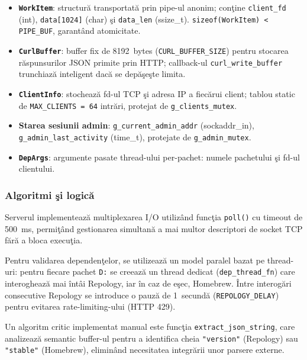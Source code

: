\documentclass[12pt, a4paper]{article}
\begin{document}
\begin{itemize}
    \item \textbf{\texttt{WorkItem}}: structur\u{a} transportat\u{a} prin pipe-ul anonim; con\c{t}ine
    \texttt{client\_fd} (int), \texttt{data[1024]} (char) \c{s}i \texttt{data\_len} (ssize\_t).
    \texttt{sizeof(WorkItem) < PIPE\_BUF}, garantând atomicitate.
    \item \textbf{\texttt{CurlBuffer}}: buffer fix de 8192~bytes (\texttt{CURL\_BUFFER\_SIZE}) pentru
    stocarea r\u{a}spunsurilor JSON primite prin HTTP; callback-ul \texttt{curl\_write\_buffer}
    trunchiaz\u{a} inteligent dac\u{a} se dep\u{a}\c{s}e\c{s}te limita.
    \item \textbf{\texttt{ClientInfo}}: stocheaz\u{a} fd-ul TCP \c{s}i adresa IP a fiec\u{a}rui
    client; tablou static de \texttt{MAX\_CLIENTS = 64} intr\u{a}ri, protejat de
    \texttt{g\_clients\_mutex}.
    \item \textbf{Starea sesiunii admin}: \texttt{g\_current\_admin\_addr} (sockaddr\_in),
    \texttt{g\_admin\_last\_activity} (time\_t), protejate de \texttt{g\_admin\_mutex}.
    \item \textbf{\texttt{DepArgs}}: argumente pasate thread-ului per-pachet: numele pachetului
    \c{s}i fd-ul clientului.
\end{itemize}

\subsubsection{Algoritmi \c{s}i logic\u{a}}

Serverul implementeaz\u{a} multiplexarea I/O utilizând func\c{t}ia \texttt{poll()} cu timeout de
500~ms, permi\c{t}ând gestionarea simultan\u{a} a mai multor descriptori de socket TCP f\u{a}r\u{a}
a bloca execu\c{t}ia.

Pentru validarea dependen\c{t}elor, se utilizeaz\u{a} un model paralel bazat pe thread-uri: pentru
fiecare pachet \texttt{D:} se creeaz\u{a} un thread dedicat (\texttt{dep\_thread\_fn}) care
interogheaz\u{a} mai \^{i}nt\^{a}i Repology, iar \^{i}n caz de e\c{s}ec, Homebrew. \^{I}ntre
interog\u{a}ri consecutive Repology se introduce o pauz\u{a} de 1~secund\u{a}
(\texttt{REPOLOGY\_DELAY}) pentru evitarea rate-limiting-ului (HTTP 429).

Un algoritm critic implementat manual este func\c{t}ia \texttt{extract\_json\_string}, care
analizeaz\u{a} semantic buffer-ul pentru a identifica cheia \texttt{"version"} (Repology) sau
\texttt{"stable"} (Homebrew), eliminând necesitatea integr\u{a}rii unor parsere externe.
\end{document}
